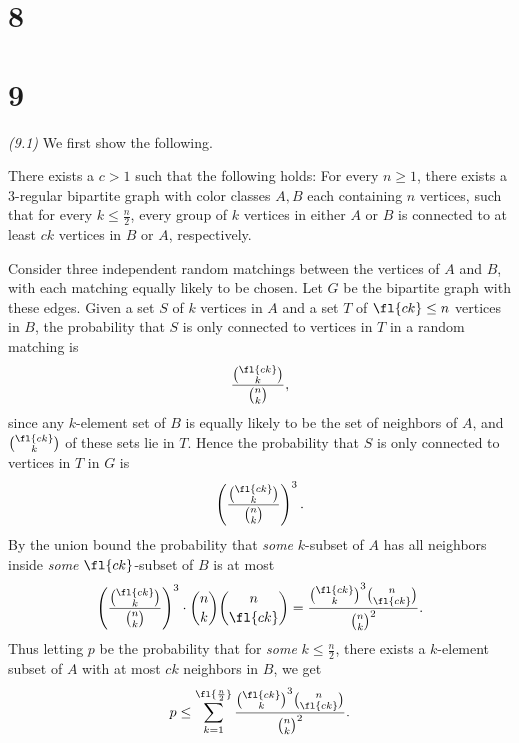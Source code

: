 \section{8}
\section{9}

\begin{problem}{\it(9.1)}
We first show the following. 
\begin{clm}\label{c1}
There exists a $c>1$ such that the following holds: For every $n\ge 1$,
there exists a 3-regular bipartite graph with color classes $A,B$ each containing $n$ vertices, such that for every $k\le \frac n2$, every group of $k$ vertices in either $A$ or $B$ is connected to at least $ck$ vertices in $B$ or $A$, respectively.

\end{clm}

Consider three independent random matchings between the vertices of $A$ and $B$, with each matching equally likely to be chosen. Let $G$ be the bipartite graph with these edges. 
Given a set $S$ of $k$ vertices in $A$ and a set $T$ of $\fl{ck}\le n$ vertices in $B$, the probability that $S$ is only connected to vertices in $T$ in a random matching is
\[\frac{\binom{\fl{ck}}{k}}{\binom{n}{k}},\] 
since any $k$-element set of $B$ is equally likely to be the set of neighbors of $A$, and $\binom{\fl{ck}}{k}$ of these sets lie in $T$. 
Hence the probability that $S$ is only connected to vertices in $T$ in $G$ is \[\left(\frac{\binom{\fl{ck}}{k}}{\binom{n}{k}}\right)^3.\]
By the union bound the probability that {\it some} $k$-subset of $A$ has all neighbors inside {\it some} $\fl{ck}$-subset of $B$ is at most
\[
\left(\frac{\binom{\fl{ck}}{k}}{\binom{n}{k}}\right)^3\cdot\binom nk\binom n{\fl{ck}}=\frac{\binom{\fl{ck}}{k}^3\binom n{\fl{ck}}}{\binom nk^2}.
\]
Thus letting $p$ be the probability that for {\it some} $k\le \frac n2$, there exists a $k$-element subset of $A$ with at most $ck$ neighbors in $B$, we get
\[
p\le\sum_{k=1}^{\fl{\frac n2}} \frac{\binom{\fl{ck}}{k}^3\binom{n}{\fl{ck}}}{\binom nk^2}.
\]


\end{problem}
